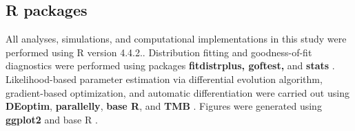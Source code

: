 \documentclass[pdflatex,sn-mathphys-num]{sn-jnl}
\theoremstyle{thmstyleone}%
\theoremstyle{thmstyletwo}%
\theoremstyle{thmstylethree}%
\begin{document}
\subsection*{R packages}
All analyses, simulations, and computational implementations in this study were performed using R version 4.4.2.\cite{R-base}. Distribution fitting and goodness-of-fit diagnostics were performed using packages \textbf{fitdistrplus, goftest,} and \textbf{stats} \cite{fitdistrplus2015, goftest2021, R-base}. Likelihood-based parameter estimation via differential evolution algorithm, gradient-based optimization, and automatic differentiation were carried out using \textbf{DEoptim}, \textbf{parallelly}, \textbf{base R}, and \textbf{TMB} \cite{mullen2011deoptim,  bengtsson2025parallelly, R-base,kristensen2016tmb}. Figures were generated using \textbf{ggplot2} \cite{wickham2016ggplot2} and base R \cite{R-base}.
\end{document}
